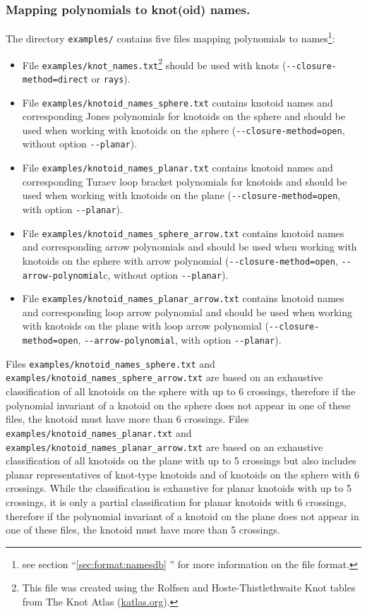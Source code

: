 \subsubsection{Mapping polynomials to knot(oid) names.}
The directory \lstinline{examples/} contains five files mapping polynomials to names\footnote{see section ``\ref{sec:format:namesdb} '' for more information on the file format.}:
\begin{itemize}
\item File \lstinline{examples/knot_names.txt}\footnote{This file was created using the Rolfsen and Hoste-Thistlethwaite Knot tables from The Knot Atlas (\url{katlas.org}).} should be used with knots (\lstinline{--closure-method=direct} or \lstinline{rays}).
\item File \lstinline{examples/knotoid_names_sphere.txt} contains knotoid names and corresponding Jones polynomials for knotoids on the sphere and should be used when working with knotoids on the sphere (\lstinline{--closure-method=open}, without option \lstinline{--planar}).
\item File \lstinline{examples/knotoid_names_planar.txt}  contains knotoid names and corresponding Turaev loop bracket polynomials for knotoids and should be used when working with knotoids on the plane (\lstinline{--closure-method=open}, with option \lstinline{--planar}).
\item File \lstinline{examples/knotoid_names_sphere_arrow.txt}  contains knotoid names and corresponding arrow polynomials and should be used when working with knotoids on the sphere with arrow polynomial (\lstinline{--closure-method=open}, \lstinline{--arrow-polynomial}c, without option \lstinline{--planar}).
\item File \lstinline{examples/knotoid_names_planar_arrow.txt}  contains knotoid names and corresponding loop arrow polynomial and should be used when working with knotoids on the plane with loop arrow polynomial (\lstinline{--closure-method=open}, \lstinline{--arrow-polynomial}, with option \lstinline{--planar}).
\end{itemize}
Files \lstinline{examples/knotoid_names_sphere.txt} and \lstinline{examples/knotoid_names_sphere_arrow.txt} are based on an exhaustive classification of all knotoids on the sphere with up to 6 crossings, therefore if the polynomial invariant of a knotoid on the sphere does not appear in one of these files, the knotoid must have more than 6 crossings.
Files \lstinline{examples/knotoid_names_planar.txt} and \lstinline{examples/knotoid_names_planar_arrow.txt} are based on an exhaustive classification of all knotoids on the plane with up to 5 crossings but also includes planar representatives of knot-type knotoids and of knotoids on the sphere with 6 crossings. While the classification is exhaustive for planar knotoids with up to 5 crossings, it is only a partial classification for planar knotoids with 6 crossings, therefore if the polynomial invariant of a knotoid on the plane does not appear in one of these files, the knotoid must have more than 5 crossings.

